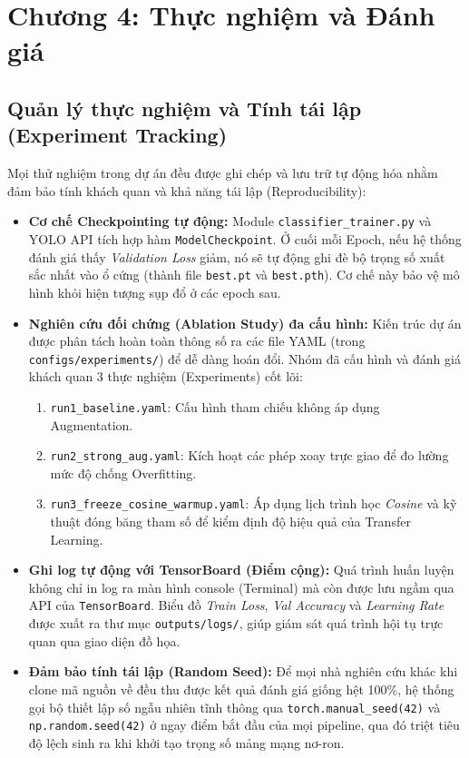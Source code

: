 \documentclass[12pt, a4paper]{article}
\begin{document}
\section{Chương 4: Thực nghiệm và Đánh giá}
\subsection{Quản lý thực nghiệm và Tính tái lập (Experiment Tracking)}
Mọi thử nghiệm trong dự án đều được ghi chép và lưu trữ tự động hóa nhằm đảm bảo tính khách quan và khả năng tái lập (Reproducibility):
\begin{itemize}
    \item \textbf{Cơ chế Checkpointing tự động:} Module \texttt{classifier\_trainer.py} và YOLO API tích hợp hàm \texttt{ModelCheckpoint}. Ở cuối mỗi Epoch, nếu hệ thống đánh giá thấy \textit{Validation Loss} giảm, nó sẽ tự động ghi đè bộ trọng số xuất sắc nhất vào ổ cứng (thành file \texttt{best.pt} và \texttt{best.pth}). Cơ chế này bảo vệ mô hình khỏi hiện tượng sụp đổ ở các epoch sau.
    \item \textbf{Nghiên cứu đối chứng (Ablation Study) đa cấu hình:} Kiến trúc dự án được phân tách hoàn toàn thông số ra các file YAML (trong \texttt{configs/experiments/}) để dễ dàng hoán đổi. Nhóm đã cấu hình và đánh giá khách quan 3 thực nghiệm (Experiments) cốt lõi:
    \begin{enumerate}
        \item \texttt{run1\_baseline.yaml}: Cấu hình tham chiếu không áp dụng Augmentation.
        \item \texttt{run2\_strong\_aug.yaml}: Kích hoạt các phép xoay trực giao để đo lường mức độ chống Overfitting.
        \item \texttt{run3\_freeze\_cosine\_warmup.yaml}: Áp dụng lịch trình học \textit{Cosine} và kỹ thuật đóng băng tham số để kiểm định độ hiệu quả của Transfer Learning.
    \end{enumerate}
    \item \textbf{Ghi log tự động với TensorBoard (Điểm cộng):} Quá trình huấn luyện không chỉ in log ra màn hình console (Terminal) mà còn được lưu ngầm qua API của \texttt{TensorBoard}. Biểu đồ \textit{Train Loss}, \textit{Val Accuracy} và \textit{Learning Rate} được xuất ra thư mục \texttt{outputs/logs/}, giúp giám sát quá trình hội tụ trực quan qua giao diện đồ họa.
    \item \textbf{Đảm bảo tính tái lập (Random Seed):} Để mọi nhà nghiên cứu khác khi clone mã nguồn về đều thu được kết quả đánh giá giống hệt 100\%, hệ thống gọi bộ thiết lập số ngẫu nhiên tĩnh thông qua \texttt{torch.manual\_seed(42)} và \texttt{np.random.seed(42)} ở ngay điểm bắt đầu của mọi pipeline, qua đó triệt tiêu độ lệch sinh ra khi khởi tạo trọng số mảng mạng nơ-ron.
\end{itemize}
\end{document}
